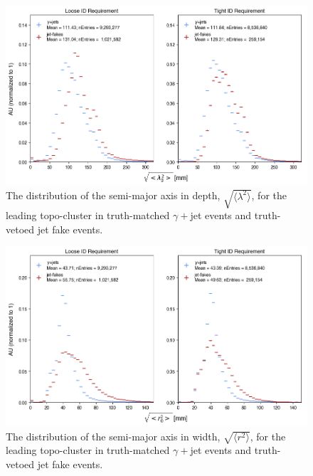 
\begin{figure}
    \centering
    \includegraphics[width=\textwidth]{chapters/chapter4_photonID/images/hists/y_topoCluster0_secondLambda.png}
    \caption[The distribution of the semi-major axis in depth, $\sqrt{\langle \lambda^2 \rangle}$, for the leading topo-cluster]{The distribution of the semi-major axis in depth, $\sqrt{\langle \lambda^2 \rangle}$, for the leading topo-cluster in truth-matched $\gamma+$jet events and truth-vetoed jet fake events.}
    \label{fig:topo-secondLambda}

\end{figure}

\begin{figure}[t]
    \centering 
    \includegraphics[width=\textwidth]{chapters/chapter4_photonID/images/hists/y_topoCluster0_secondR.png}
    \caption[The distribution of the semi-major axis in width, $\sqrt{\langle r^2 \rangle}$, for the leading topo-cluster]{The distribution of the semi-major axis in width, $\sqrt{\langle r^2 \rangle}$, for the leading topo-cluster in truth-matched $\gamma+$jet events and truth-vetoed jet fake events.}
    \label{fig:topo-secondR}
\end{figure}



